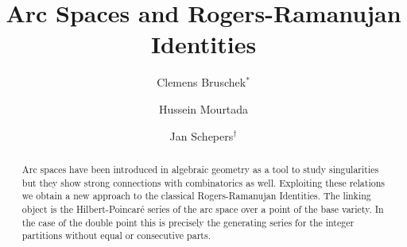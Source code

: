 \documentclass[a4paper,10pt]{amsart}
\title{Arc Spaces and Rogers-Ramanujan Identities}
\author[Clemens Bruschek]{Clemens Bruschek$^*$}
\author{Hussein Mourtada}
\author[Jan Schepers]{Jan Schepers$^{\dagger}$}
\theoremstyle{remark}
\begin{document}

\begin{abstract}
  Arc spaces have been introduced in algebraic geometry as a tool to study
  singularities but they show strong connections with combinatorics as
  well. Exploiting these relations we obtain a new approach to the
  classical Rogers-Ramanujan Identities. The linking object is the
  Hilbert-Poincar\'{e} series of the arc space over a point of the
  base variety. In the case of the double point this is precisely the
  generating series for the integer partitions without equal or
  consecutive parts.
\end{abstract}

\maketitle


\normalsize










%







\end{document}
